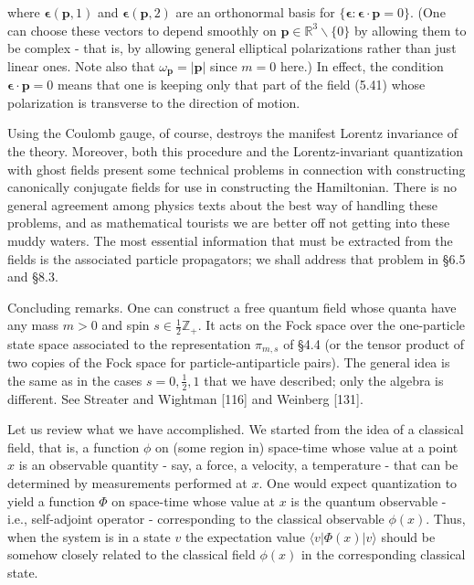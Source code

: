\documentclass[10pt, letterpaper]{article}
\begin{document}
where $\boldsymbol{\epsilon}(\mathbf{p}, 1)$ and $\boldsymbol{\epsilon}(\mathbf{p}, 2)$ are an orthonormal basis for $\{\boldsymbol{\epsilon}: \boldsymbol{\epsilon} \cdot \mathbf{p}=0\}$. (One can choose these vectors to depend smoothly on $\mathbf{p} \in \mathbb{R}^{3} \backslash\{0\}$ by allowing them to be complex - that is, by allowing general elliptical polarizations rather than just linear ones. Note also that $\omega_{\mathbf{p}}=|\mathbf{p}|$ since $m=0$ here.) In effect, the condition $\boldsymbol{\epsilon} \cdot \mathbf{p}=0$ means that one is keeping only that part of the field (5.41) whose polarization is transverse to the direction of motion.

Using the Coulomb gauge, of course, destroys the manifest Lorentz invariance of the theory. Moreover, both this procedure and the Lorentz-invariant quantization with ghost fields present some technical problems in connection with constructing canonically conjugate fields for use in constructing the Hamiltonian. There is no general agreement among physics texts about the best way of handling these problems, and as mathematical tourists we are better off not getting into these muddy waters. The most essential information that must be extracted from the fields is the associated particle propagators; we shall address that problem in §6.5 and §8.3.

Concluding remarks. One can construct a free quantum field whose quanta have any mass $m>0$ and spin $s \in \frac{1}{2} \mathbb{Z}_{+}$. It acts on the Fock space over the one-particle state space associated to the representation $\pi_{m, s}$ of §4.4 (or the tensor product of two copies of the Fock space for particle-antiparticle pairs). The general idea is the same as in the cases $s=0, \frac{1}{2}, 1$ that we have described; only the algebra is different. See Streater and Wightman [116] and Weinberg [131].

Let us review what we have accomplished. We started from the idea of a classical field, that is, a function $\phi$ on (some region in) space-time whose value at a point $x$ is an observable quantity - say, a force, a velocity, a temperature - that can be determined by measurements performed at $x$. One would expect quantization to yield a function $\Phi$ on space-time whose value at $x$ is the quantum observable - i.e., self-adjoint operator - corresponding to the classical observable $\phi(x)$. Thus, when the system is in a state $v$ the expectation value $\langle v| \Phi(x)|v\rangle$ should be somehow closely related to the classical field $\phi(x)$ in the corresponding classical state.
\end{document}
